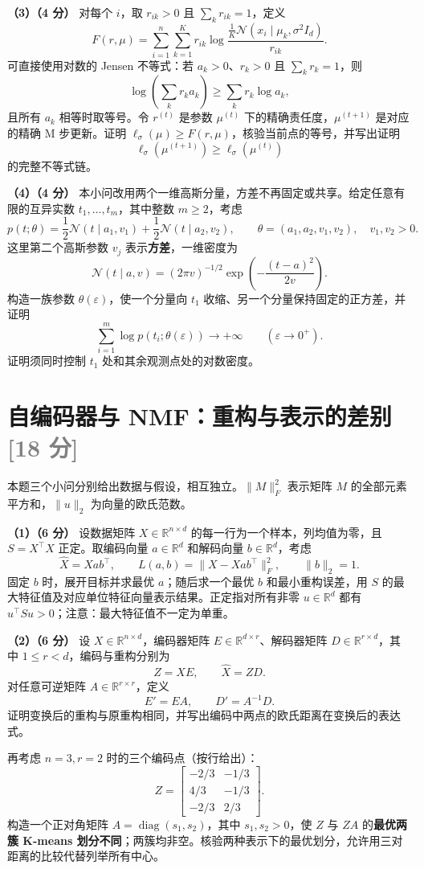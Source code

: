 \documentclass[11pt,a4paper]{article}
\newcommand{\R}{\mathbb R}
\newcommand{\diag}{\operatorname{diag}}
\newcommand{\partq}[2]{\par\Needspace{6\baselineskip}\noindent\textbf{（#1）（#2 分）}}
\newcommand{\studentbreak}{\clearpage}
\begin{document}
\studentbreak
\partq{3}{4} 对每个 $i$，取 $r_{ik}>0$ 且 $\sum_k r_{ik}=1$，定义
\[
F(r,\mu)=\sum_{i=1}^n\sum_{k=1}^K
r_{ik}\log\frac{\frac1K\mathcal N(x_i\mid\mu_k,\sigma^2I_d)}{r_{ik}}.
\]
可直接使用对数的 Jensen 不等式：若 $a_k>0$、$r_k>0$ 且 $\sum_k r_k=1$，则
\[
\log\!\left(\sum_k r_k a_k\right)\geq\sum_k r_k\log a_k,
\]
且所有 $a_k$ 相等时取等号。令 $r^{(t)}$ 是参数 $\mu^{(t)}$ 下的精确责任度，$\mu^{(t+1)}$ 是对应的精确 M 步更新。证明 $\ell_\sigma(\mu)\geq F(r,\mu)$，核验当前点的等号，并写出证明
\[
\ell_\sigma(\mu^{(t+1)})\geq\ell_\sigma(\mu^{(t)})
\]
的完整不等式链。

\partq{4}{4} 本小问改用两个一维高斯分量，方差不再固定或共享。给定任意有限的互异实数 $t_1,\ldots,t_m$，其中整数 $m\geq2$，考虑
\[
p(t;\theta)=\frac12\mathcal N(t\mid a_1,v_1)
+\frac12\mathcal N(t\mid a_2,v_2),
\qquad \theta=(a_1,a_2,v_1,v_2),\quad v_1,v_2>0.
\]
这里第二个高斯参数 $v_j$ 表示\textbf{方差}，一维密度为
\[
\mathcal N(t\mid a,v)=(2\pi v)^{-1/2}
\exp\!\left(-\frac{(t-a)^2}{2v}\right).
\]
构造一族参数 $\theta(\varepsilon)$，使一个分量向 $t_1$ 收缩、另一个分量保持固定的正方差，并证明
\[
\sum_{i=1}^m\log p(t_i;\theta(\varepsilon))\longrightarrow+\infty
\qquad(\varepsilon\to0^+).
\]
证明须同时控制 $t_1$ 处和其余观测点处的对数密度。

\clearpage
\section[自编码器与 NMF]{自编码器与 NMF：重构与表示的差别\hfill\textcolor{gray}{[18 分]}}
本题三个小问分别给出数据与假设，相互独立。$\|M\|_F^2$ 表示矩阵 $M$ 的全部元素平方和，$\|u\|_2$ 为向量的欧氏范数。

\partq{1}{6} 设数据矩阵 $X\in\R^{n\times d}$ 的每一行为一个样本，列均值为零，且 $S=X^\top X$ 正定。取编码向量 $a\in\R^d$ 和解码向量 $b\in\R^d$，考虑
\[
\widehat X=Xab^\top,\qquad
L(a,b)=\|X-Xab^\top\|_F^2,\qquad \|b\|_2=1.
\]
固定 $b$ 时，展开目标并求最优 $a$；随后求一个最优 $b$ 和最小重构误差，用 $S$ 的最大特征值及对应单位特征向量表示结果。正定指对所有非零 $u\in\R^d$ 都有 $u^\top Su>0$；注意：最大特征值不一定为单重。

\partq{2}{6} 设 $X\in\R^{n\times d}$，编码器矩阵 $E\in\R^{d\times r}$、解码器矩阵 $D\in\R^{r\times d}$，其中 $1\leq r<d$，编码与重构分别为
\[
Z=XE,\qquad \widehat X=Z D.
\]
对任意可逆矩阵 $A\in\R^{r\times r}$，定义
\[
E'=EA,\qquad D'=A^{-1}D.
\]
证明变换后的重构与原重构相同，并写出编码中两点的欧氏距离在变换后的表达式。

再考虑 $n=3,r=2$ 时的三个编码点（按行给出）：
\[
Z=\begin{bmatrix}
-2/3&-1/3\\
4/3&-1/3\\
-2/3&2/3
\end{bmatrix}.
\]
构造一个正对角矩阵 $A=\diag(s_1,s_2)$，其中 $s_1,s_2>0$，使 $Z$ 与 $ZA$ 的\textbf{最优两簇 K-means 划分不同}；两簇均非空。核验两种表示下的最优划分，允许用三对距离的比较代替列举所有中心。
\end{document}
